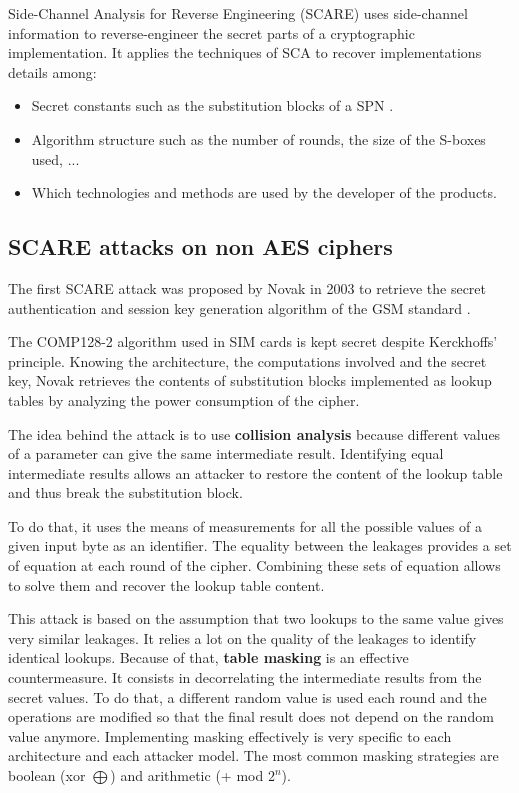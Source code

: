 \documentclass[11pt]{sdm}
\begin{document}
Side-Channel Analysis for Reverse Engineering (SCARE) uses side-channel information to reverse-engineer the secret parts of a cryptographic implementation.
It applies the techniques of SCA to recover implementations details among:
\begin{itemize}
    \item Secret constants such as the substitution blocks of a SPN \parencite{Novak_2003}.
    \item Algorithm structure such as the number of rounds, the size of the S-boxes used, ...
    \item Which technologies and methods are used by the developer of the products.
\end{itemize}

\subsection{SCARE attacks on non AES ciphers}

The first SCARE attack was proposed by Novak in 2003 to retrieve the secret authentication and session key generation algorithm of the GSM standard \parencite{Novak_2003}.

The COMP128-2 algorithm used in SIM cards is kept secret despite Kerckhoffs' principle.
Knowing the architecture, the computations involved and the secret key, Novak retrieves the contents of substitution blocks implemented as lookup tables by analyzing the power consumption of the cipher.

The idea behind the attack is to use \textbf{collision analysis} because different values of a parameter can give the same intermediate result.
Identifying equal intermediate results allows an attacker to restore the content of the lookup table and thus break the substitution block.

To do that, it uses the means of measurements for all the possible values of a given input byte as an identifier.
The equality between the leakages provides a set of equation at each round of the cipher.
Combining these sets of equation allows to solve them and recover the lookup table content.

This attack is based on the assumption that two lookups to the same value gives very similar leakages.
It relies a lot on the quality of the leakages to identify identical lookups.
Because of that, \textbf{table masking} is an effective countermeasure.
It consists in decorrelating the intermediate results from the secret values.
To do that, a different random value is used each round and the operations are modified so that the final result does not depend on the random value anymore.
Implementing masking effectively is very specific to each architecture and each attacker model.
The most common masking strategies are boolean (xor $\bigoplus$) and arithmetic (+ mod $2^n$). %
\end{document}
